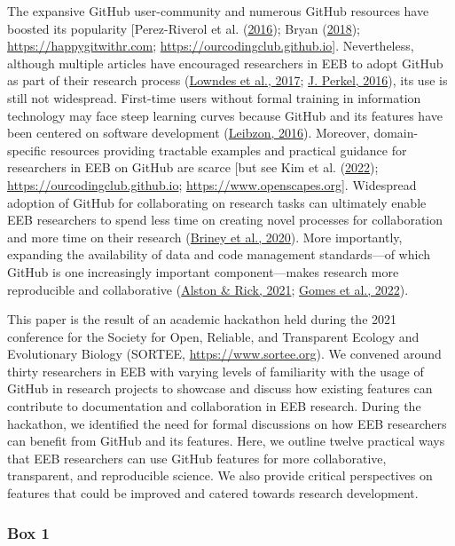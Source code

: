 The expansive GitHub user-community and numerous GitHub resources have boosted its popularity {[}Perez-Riverol et al. (\protect\hyperlink{ref-kEX5dgzK}{2016}); Bryan (\protect\hyperlink{ref-RVetqmsg}{2018}); \url{https://happygitwithr.com}; \url{https://ourcodingclub.github.io}{]}.
Nevertheless, although multiple articles have encouraged researchers in EEB to adopt GitHub as part of their research process (\protect\hyperlink{ref-3DKwn1sY}{Lowndes et al., 2017}; \protect\hyperlink{ref-10ghgV3S8}{J. Perkel, 2016}), its use is still not widespread.
First-time users without formal training in information technology may face steep learning curves because GitHub and its features have been centered on software development (\protect\hyperlink{ref-139b0pSGc}{Leibzon, 2016}).
Moreover, domain-specific resources providing tractable examples and practical guidance for researchers in EEB on GitHub are scarce {[}but see Kim et al. (\protect\hyperlink{ref-lJAgyhYq}{2022}); \url{https://ourcodingclub.github.io}; \url{https://www.openscapes.org}{]}.
Widespread adoption of GitHub for collaborating on research tasks can ultimately enable EEB researchers to spend less time on creating novel processes for collaboration and more time on their research (\protect\hyperlink{ref-ydrk01SR}{Briney et al., 2020}).
More importantly, expanding the availability of data and code management standards---of which GitHub is one increasingly important component---makes research more reproducible and collaborative (\protect\hyperlink{ref-13QX8XU3J}{Alston \& Rick, 2021}; \protect\hyperlink{ref-VDJput1V}{Gomes et al., 2022}).

This paper is the result of an academic hackathon held during the 2021 conference for the Society for Open, Reliable, and Transparent Ecology and Evolutionary Biology (SORTEE, \url{https://www.sortee.org}).
We convened around thirty researchers in EEB with varying levels of familiarity with the usage of GitHub in research projects to showcase and discuss how existing features can contribute to documentation and collaboration in EEB research.
During the hackathon, we identified the need for formal discussions on how EEB researchers can benefit from GitHub and its features.
Here, we outline twelve practical ways that EEB researchers can use GitHub features for more collaborative, transparent, and reproducible science.
We also provide critical perspectives on features that could be improved and catered towards research development.

\hypertarget{definitions}{%
\subsubsection{Box 1}\label{definitions}}

